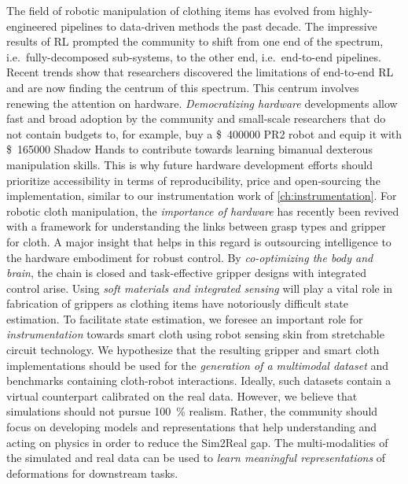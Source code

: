 \documentclass[\home/main.tex]{subfiles}
\begin{document}
The field of robotic manipulation of clothing items has evolved from highly-engineered pipelines to data-driven methods the past decade. The impressive results of \gls{RL} prompted the community to shift from one end of the spectrum, i.e.\ fully-decomposed sub-systems, to the other end, i.e.\ end-to-end pipelines. Recent trends show that researchers discovered the limitations of end-to-end \gls{RL} and are now finding the centrum of this spectrum. 
This centrum involves renewing the attention on hardware.
\emph{Democratizing hardware} developments allow fast and broad adoption by the community and small-scale researchers that do not contain budgets to, for example, buy a \SI{400000}[\$]{} PR2 robot and equip it with \SI{165000}[\$]{} Shadow Hands to contribute towards learning bimanual dexterous manipulation skills. 
This is why future hardware development efforts should prioritize accessibility in terms of reproducibility, price and open-sourcing the implementation, similar to our instrumentation work of \cref{ch:instrumentation}. 
For robotic cloth manipulation, the \emph{importance of hardware} has recently been revived with a framework for understanding the links between grasp types and gripper for cloth.
A major insight that helps in this regard is outsourcing intelligence to the hardware embodiment for robust control. By \emph{co-optimizing the body and brain}, the chain is closed and task-effective gripper designs with integrated control arise. 
Using \emph{soft materials and integrated sensing} will play a vital role in fabrication of grippers as clothing items have notoriously difficult state estimation.
To facilitate state estimation, we foresee an important role for \emph{instrumentation} towards smart cloth using robot sensing skin from stretchable circuit technology. 
We hypothesize that the resulting gripper and smart cloth implementations should be used for the \emph{generation of a multimodal dataset} and benchmarks containing cloth-robot interactions. Ideally, such datasets contain a virtual counterpart calibrated on the real data. However, we believe that simulations should not pursue \qty{100}{\percent} realism. Rather, the community should focus on developing models and representations that help understanding and acting on physics in order to reduce the Sim2Real gap. 
The multi-modalities of the simulated and real data can be used to \emph{learn meaningful representations} of deformations for downstream tasks.
\end{document}
